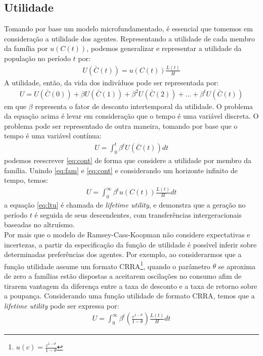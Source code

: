 \documentclass[11pt,a4paper]{article}
\begin{document}
\subsection{Utilidade}
Tomando por base um modelo microfundamentado, é essencial que tomemos em consideração a utilidade dos agentes. Representando a utilidade de cada membro da família por $u(C(t))$, podemos generalizar e representar a utilidade da população no período $t$ por:
\begin{align*}
U(\bar{C}(t)) = u(C(t))\frac{L(t)}{H}
\end{align*} 
\noindent
A utilidade, então, da vida dos indivíduos pode ser representada por:
\begin{align}
U = U(\bar{C}(0)) + \beta U(\bar{C}(1)) + \beta^2 U(\bar{C}(2)) + \dots + \beta^t U(\bar{C}(t)) 
\end{align}
\noindent
em que $\beta$ representa o fator de desconto intertemporal da utilidade. O problema da equação acima é levar em consideração que o tempo é uma variável discreta. O problema pode ser representado de outra maneira, tomando por base que o tempo é uma variável contínua:
\begin{align} \label{eq:cont}
U = \int_0 ^t \beta^t U(\bar{C}(t))dt
\end{align}
\noindent
podemos reescrever \eqref{eq:cont} de forma que considere a utilidade por membro da família. Unindo \eqref{eq:fam} e \eqref{eq:cont} e considerando um horizonte infinito de tempo, temos:
\begin{align} \label{eq:ltu}
U = \int_0 ^\infty \beta^t u(C(t))\frac{L(t)}{H} dt
\end{align}
\noindent
a equação \eqref{eq:ltu} é chamada de \textit{lifetime utility}, e demonstra que a geração no período $t$ é seguida de seus descendentes, com transferências intergeracionais baseadas no altruísmo.\\

Por mais que o modelo de Ramsey-Cass-Koopman não considere expectativas e incertezas, a partir da especificação da função de utilidade é possível inferir sobre determinadas preferências dos agentes. Por exemplo, ao considerarmos que a função utilidade assume um formato CRRA\footnote{$u(c) = \frac{c^{1-\theta}}{1-\theta}$}, quando o parâmetro $\theta$ se aproxima de zero a famílias estão dispostas a aceitarem oscilações no consumo afim de tirarem vantagem da diferença entre a taxa de desconto e a taxa de retorno sobre a poupança. Considerando uma função utilidade de formato CRRA, temos que a \textit{lifetime utility} pode ser expressa por:
\begin{align*} 
U = \int_0 ^\infty \beta^t \left(\frac{c^{1-\theta}}{1-\theta}\right)\frac{L(t)}{H} dt
\end{align*}
\end{document}
